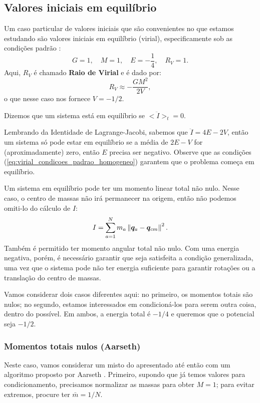 \subsection{Valores iniciais em equilíbrio}
Um caso particular de valores iniciais que são convenientes no que estamos estudando são valores iniciais em equilíbrio (virial), especificamente sob as condições padrão \cite{heggie_mathieu_unidades}:
\begin{equation}\label{eq:virial_condicoes_padrao_homogeneo}
    G = 1,
    \quad
    M = 1,
    \quad
    E = -\dfrac{1}{4},
    \quad
    R_V = 1.
\end{equation}
Aqui, $R_V$ é chamado \textbf{Raio de Virial} e é dado por:
\begin{equation}
    R_V \approx - \dfrac{G M^2}{2 V},
\end{equation}
o que nesse caso nos fornece $V = - 1/2$.

\begin{definition}
    Dizemos que um sistema está em equilíbrio se $<\ddot I>_t = 0$.
\end{definition}

Lembrando da Identidade de Lagrange-Jacobi, sabemos que $\ddot I = 4 E - 2 V$, então um sistema só pode estar em equilíbrio se a média de $2 E - V$ for (aproximadamente) zero, então $E$ precisa ser negativo. Observe que as condições (\ref{eq:virial_condicoes_padrao_homogeneo}) garantem que o problema começa em equilíbrio.

Um sistema em equilíbrio pode ter um momento linear total não nulo. Nesse caso, o centro de massas não irá permanecer na origem, então não podemos omiti-lo do cálculo de $I$:
\begin{equation}
    I = \sum_{a=1}^N m_a \left\Vert \bm q_a - \bm q_{cm} \right\Vert^2.
\end{equation}
Também é permitido ter momento angular total não nulo. Com uma energia negativa, porém, é necessário garantir que seja satisfeita a condição generalizada, uma vez que o sistema pode não ter energia suficiente para garantir rotações ou a translação do centro de massas.

Vamos considerar dois casos diferentes aqui: no primeiro, os momentos totais são nulos; no segundo, estamos interessados em condicioná-los para serem outra coisa, dentro do possível. Em ambos, a energia total é $-1/4$ e queremos que o potencial seja $-1/2$.

\subsubsection{Momentos totais nulos (Aarseth)}
Neste caso, vamos considerar um misto do apresentado até então com um algoritmo proposto por Aarseth \cite[p. 111]{aarseth_gravitational_2003}. Primeiro, supondo que já temos valores para condicionamento, precisamos normalizar as massas para obter $M=1$; para evitar extremos, procure ter $\bar m = 1/N$.

